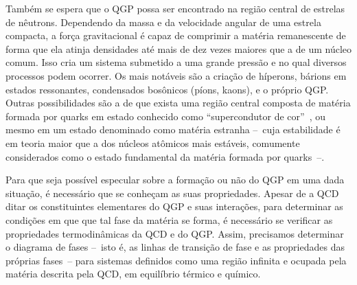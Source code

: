 Também se espera que o QGP possa ser encontrado na região central de estrelas de nêutrons. Dependendo da massa e da velocidade angular de uma estrela compacta, a força gravitacional é capaz de comprimir a matéria remanescente de forma que ela atinja densidades até mais de dez vezes maiores que a de um núcleo comum. Isso cria um sistema submetido a uma grande pressão e no qual diversos processos podem ocorrer. Os mais notáveis são a criação de híperons, bárions em estados ressonantes, condensados bosônicos (píons, kaons), e o próprio QGP. Outras possibilidades são a de que exista uma região central composta de matéria formada por quarks em estado conhecido como ``supercondutor de cor''~\parencite{Weber}, ou mesmo em um estado denominado como matéria estranha --~cuja estabilidade é em teoria maior que a dos núcleos atômicos mais estáveis, comumente considerados como o estado fundamental da matéria formada por quarks~--.


Para que seja possível especular sobre a formação ou não do QGP em uma dada situação, é necessário que se conheçam as suas propriedades. Apesar de a QCD ditar os constituintes elementares do QGP e suas interações, para determinar as condições em que que tal fase da matéria se forma, é necessário se verificar as propriedades termodinâmicas da QCD e do QGP. Assim, precisamos determinar o diagrama de fases --~isto é, as linhas de transição de fase e as propriedades das próprias fases~-- para sistemas definidos como uma região infinita e ocupada pela matéria descrita pela QCD, em equilíbrio térmico e químico.


